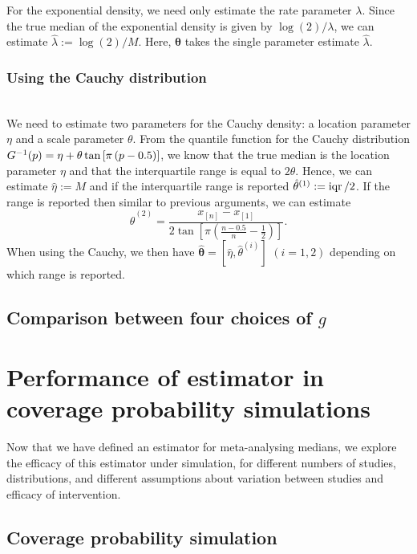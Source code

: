 \documentclass{article}
\begin{document}
\noindent For the exponential density, we need only estimate the rate parameter $\lambda$. Since the true median of the exponential density is given by $\log (2)/ \lambda$, we can estimate $\hat\lambda := \log (2)/ M$.  Here, $\bm{\hat \theta}$ takes the single parameter estimate $\hat \lambda$.

\subsubsection{Using the Cauchy distribution}~\\

\noindent We need to estimate two parameters for the Cauchy density: a location parameter $\eta$ and a scale parameter $\theta$. From the quantile function for the Cauchy distribution $G^{-1}(p) = \eta + \theta\tan\left[\pi \left(p - 0.5 \right)\right]$, we know that the true median is the location parameter $\eta$ and that the interquartile range is equal to $2\theta$. Hence, we can estimate $\hat\eta := M$ and if the interquartile range is reported $\hat{\theta}^{(1)} := \operatorname{iqr}/ 2$.  If the range is reported then similar to previous arguments, we can estimate $$\hat{\theta}^{(2)} = \frac{x_{[n]} - x_{[1]}}{2\tan\left[\pi\left(\frac{n-0.5}{n}-\frac{1}{2}\right)\right]}.$$
When using the Cauchy, we then have $\hat{\bm{\theta}}=[\hat \eta, \hat{\theta}^{(i)}]$ $(i=1,2)$ depending on which range is reported.

\subsection{Comparison between four choices of $g$}
\label{sec: comparison}


\section{Performance of estimator in coverage probability simulations}

Now that we have defined an estimator for meta-analysing medians, we explore the efficacy of this estimator under simulation, for different numbers of studies, distributions, and different assumptions about variation between studies and efficacy of intervention.

\subsection{Coverage probability simulation}
\end{document}

